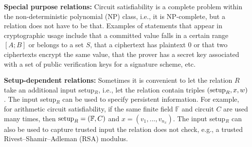 \textbf{Special purpose relations:} Circuit satisfiability is 
a complete problem within the non-deter\-min\-istic polynomial (NP) class,
i.e., it is NP-complete,
but a relation does not have to be that. 
	Examples of statements that appear in cryptographic usage include that a committed value falls in a certain range $[A;B]$ or belongs to a set $S$, that a ciphertext has plaintext 0 or that two ciphertexts encrypt the same value, that the prover has a secret key associated with a set of public verification keys for a signature scheme, etc.


\textbf{Setup-dependent relations:} 
	Sometimes it is convenient to let the relation $R$ take an additional input setup$_R$, i.e., let the relation contain triples $(\textmd{setup}_R, x, w)$. 
	The input setup$_R$ can be used to specify persistent information.
	For example, for arithmetic circuit satisfiability, if the same finite field $\mathbb{F}$ and circuit $C$ are used many times, 
then $\textmd{setup}_R = (\mathbb{F}, C)$ and $x = (v_1,...,v_{n_x})$.
	The input setup$_R$ can also be used to capture trusted input the relation does not check, 
e.g., a trusted Rivest--Shamir--Adleman (RSA) modulus.

